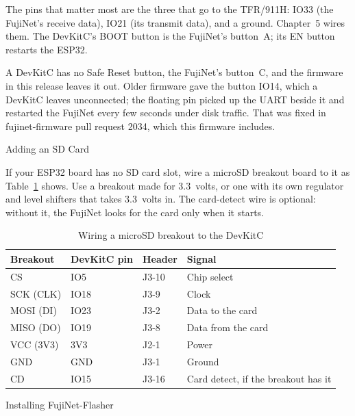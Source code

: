 \documentclass[10pt,twoside,openany]{book}
\makeatletter
\newcommand{\key}[1]{\textsf{\small #1}}     %
\newcommand{\pin}[1]{\textsf{#1}}            %
\renewcommand{\section}{\@startsection{section}{1}{0pt}{3.2ex plus 1ex}{1.2ex}%
  {\sffamily\bfseries\large}}
\makeatother
\begin{document}
The pins that matter most are the three that go to the TFR/911H:
\pin{IO33} (the FujiNet's receive data), \pin{IO21} (its transmit data),
and a ground. Chapter~5 wires them. The DevKitC's \key{BOOT} button is the
FujiNet's button~A; its \key{EN} button restarts the ESP32.

A DevKitC has no Safe Reset button, the FujiNet's button~C, and the
firmware in this release leaves it out. Older firmware gave the button
\pin{IO14}, which a DevKitC leaves unconnected; the floating pin picked up
the UART beside it and restarted the FujiNet every few seconds under disk
traffic. That was fixed in fujinet-firmware pull request 2034, which this
firmware includes.

\section{Adding an SD Card}\label{sec:sd}

If your ESP32 board has no SD card slot, wire a microSD breakout board to
it as Table~\ref{tab:sd} shows. Use a breakout made for 3.3~volts, or one
with its own regulator and level shifters that takes 3.3~volts in. The
card-detect wire is optional: without it, the FujiNet looks for the card
only when it starts.

\begin{table}[H]
\caption{Wiring a microSD breakout to the DevKitC}\label{tab:sd}
\begin{tabularx}{\linewidth}{@{}l l l X@{}}
\toprule
\textbf{Breakout} & \textbf{DevKitC pin} & \textbf{Header} & \textbf{Signal}\\
\midrule
CS & \pin{IO5} & \pin{J3-10} & Chip select\\
SCK (CLK) & \pin{IO18} & \pin{J3-9} & Clock\\
MOSI (DI) & \pin{IO23} & \pin{J3-2} & Data to the card\\
MISO (DO) & \pin{IO19} & \pin{J3-8} & Data from the card\\
VCC (3V3) & \pin{3V3} & \pin{J2-1} & Power\\
GND & \pin{GND} & \pin{J3-1} & Ground\\
CD & \pin{IO15} & \pin{J3-16} & Card detect, if the breakout has it\\
\bottomrule
\end{tabularx}
\end{table}

\section{Installing FujiNet-Flasher}
\end{document}
